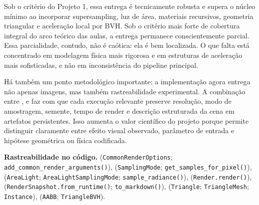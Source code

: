 \documentclass[portuguese]{sbcreviews-2025}%
\begin{document}
Sob o critério do Projeto 1, essa entrega é tecnicamente robusta e supera o núcleo mínimo ao incorporar supersampling, luz de área, materiais recursivos, geometria triangular e aceleração local por BVH. Sob o critério mais forte de cobertura integral do arco teórico das aulas, a entrega permanece conscientemente parcial. Essa parcialidade, contudo, não é caótica: ela é bem localizada. O que falta está concentrado em modelagem física mais rigorosa e em estruturas de aceleração mais sofisticadas, e não em inconsistência do pipeline principal.

Há também um ponto metodológico importante: a implementação agora entrega não apenas imagens, mas também rastreabilidade experimental. A combinação entre ,  e  faz com que cada execução relevante preserve resolução, modo de amostragem, semente, tempo de render e descrição estruturada da cena em artefatos persistentes. Isso aumenta o valor científico do projeto porque permite distinguir claramente entre efeito visual observado, parâmetro de entrada e hipótese geométrica ou física codificada.

\noindent\textbf{Rastreabilidade no código.}  (\texttt{CommonRenderOptions}; \texttt{add\_common\_render\_arguments()}),  (\texttt{SamplingMode}; \texttt{get\_samples\_for\_pixel()}),  (\texttt{AreaLight}; \texttt{AreaLightSamplingMode}; \texttt{sample\_radiance()}),  (\texttt{Render.render()}),  (\texttt{RenderSnapshot.from\_runtime()}; \texttt{to\_markdown()}),  (\texttt{Triangle}; \texttt{TriangleMesh}; \texttt{Instance}),  (\texttt{AABB}; \texttt{TriangleBVH}).
\end{document}

